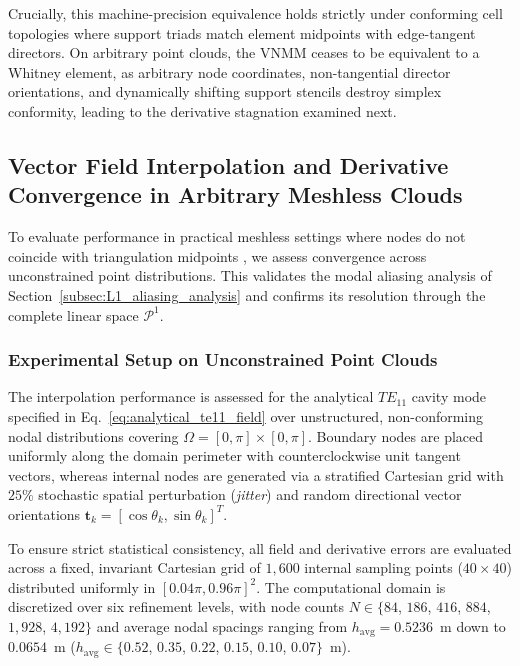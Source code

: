 \documentclass[preprint,12pt]{elsarticle}
\begin{document}
Crucially, this machine-precision equivalence holds strictly under conforming cell topologies where support triads match element midpoints with edge-tangent directors. On arbitrary point clouds, the VNMM ceases to be equivalent to a Whitney element, as arbitrary node coordinates, non-tangential director orientations, and dynamically shifting support stencils destroy simplex conformity, leading to the derivative stagnation examined next.


\subsection{Vector Field Interpolation and Derivative Convergence in Arbitrary Meshless Clouds}
\label{subsec:arbitrary_meshless_interpolation}

To evaluate performance in practical meshless settings where nodes do not coincide with triangulation midpoints \cite{goncalves2023vector, goncalves2025tese}, we assess convergence across unconstrained point distributions. This validates the modal aliasing analysis of Section~\ref{subsec:L1_aliasing_analysis} and confirms its resolution through the complete linear space $\mathcal{P}^1$.
\subsubsection{Experimental Setup on Unconstrained Point Clouds}
The interpolation performance is assessed for the analytical $TE_{11}$ cavity mode specified in Eq.~\eqref{eq:analytical_te11_field} over unstructured, non-conforming nodal distributions covering $\Omega = [0, \pi] \times [0, \pi]$. Boundary nodes are placed uniformly along the domain perimeter with counterclockwise unit tangent vectors, whereas internal nodes are generated via a stratified Cartesian grid with $25\%$ stochastic spatial perturbation (\textit{jitter}) and random directional vector orientations $\mathbf{t}_k = [\cos\theta_k, \sin\theta_k]^T$.

To ensure strict statistical consistency, all field and derivative errors are evaluated across a fixed, invariant Cartesian grid of $1{,}600$ internal sampling points ($40 \times 40$) distributed uniformly in $[0.04\pi, 0.96\pi]^2$. The computational domain is discretized over six refinement levels, with node counts $N \in \{84$, $186$, $416$, $884$, $1{,}928$, $4{,}192\}$ and average nodal spacings ranging from $h_{\mathrm{avg}} = 0.5236$~m down to $0.0654$~m ($h_{\mathrm{avg}} \in \{0.52$, $0.35$, $0.22$, $0.15$, $0.10$, $0.07\}$~m).
\end{document}
